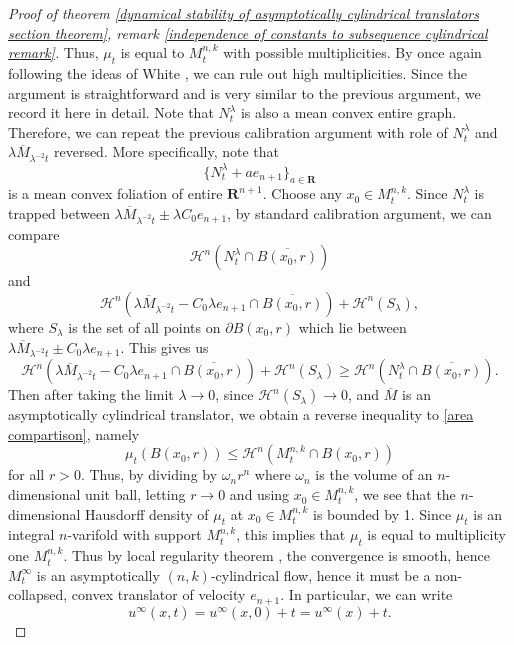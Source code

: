 \documentclass[pdflatex,sn-mathphys-num]{sn-jnl}%
\begin{document}
\begin{proof}[Proof of theorem \ref{dynamical stability of asymptotically cylindrical translators section theorem}, remark \ref{independence of constants to subsequence cylindrical remark}]
Thus, $\mu_t$ is equal to $M^{n,k}_t$ with possible multiplicities. By once again following the ideas of White \cite{White2000TheSO}, we can rule out high multiplicities. Since the argument is straightforward and is very similar to the previous argument, we record it here in detail. Note that $N^{\lambda}_t$ is also a mean convex entire graph. Therefore, we can repeat the previous calibration argument with role of $N^{\lambda}_t$ and $\lambda \overline{M}_{\lambda^{-2}t}$ reversed. More specifically, note that 
\begin{equation}
    \{ N^{\lambda}_t + ae_{n+1}\}_{a \in \mathbf{R}}
\end{equation}
is a mean convex foliation of entire $\mathbf{R}^{n+1}$. Choose any $x_0 \in M^{n,k}_{t}$. Since $N^{\lambda}_t$ is trapped between $\lambda\overline{M}_{\lambda^{-2}t} \pm \lambda C_0 e_{n+1}$, by standard calibration argument, we can compare
\begin{equation}
    \mathcal{H}^n(N^{\lambda}_t \cap \overline{B(x_0, r)})
\end{equation}
and
\begin{equation}
\mathcal{H}^n(\lambda\overline{M}_{\lambda^{-2}t} - C_0\lambda e_{n+1}\cap \overline{B(x_0, r)}) + \mathcal{H}^n(S_{\lambda}),
\end{equation}
where $S_{\lambda}$ is the set of all points on $\partial B(x_0, r)$ which lie between $\lambda \overline{M}_{\lambda^{-2}t} \pm C_0\lambda e_{n+1}$. This gives us
\begin{equation}
    \mathcal{H}^n(\lambda\overline{M}_{\lambda^{-2}t} - C_0\lambda e_{n+1}\cap \overline{B(x_0, r)}) + \mathcal{H}^n(S_{\lambda}) \geq \mathcal{H}^n(N^{\lambda}_t \cap \overline{B(x_0, r)}).
\end{equation}
Then after taking the limit $\lambda \to 0$, since $\mathcal{H}^n(S_{\lambda}) \to 0$, and $\overline{M}$ is an asymptotically cylindrical translator, we obtain a reverse inequality to \eqref{area compartison}, namely
\begin{equation}
 \mu_t(B(x_0, r)) \leq \mathcal{H}^n(M^{n,k}_t \cap B(x_0, r))   
\end{equation}
for all $r > 0$. Thus, by dividing by $\omega_nr^n$ where $\omega_n$ is the volume of an $n$-dimensional unit ball, letting $r \to 0$ and using $x_0 \in M^{n,k}_t$, we see that the $n$-dimensional Hausdorff density of $\mu_t$ at $x_0 \in M^{n,k}_t$ is bounded by 1. Since $\mu_t$ is an integral $n$-varifold with support $M^{n,k}_t$, this implies that $\mu_t$ is equal to multiplicity one $M^{n,k}_t$. Thus by local regularity theorem \cite{White2005-nl}, the convergence is smooth, hence $M^{\infty}_t$ is an asymptotically $(n,k)$-cylindrical flow, hence it must be a non-collapsed, convex translator of velocity $e_{n+1}$. In particular, we can write
\begin{equation}
    u^{\infty}(x,t) = u^{\infty}(x,0) + t = u^{\infty}(x) + t.
\end{equation}


\end{proof}
\end{document}
